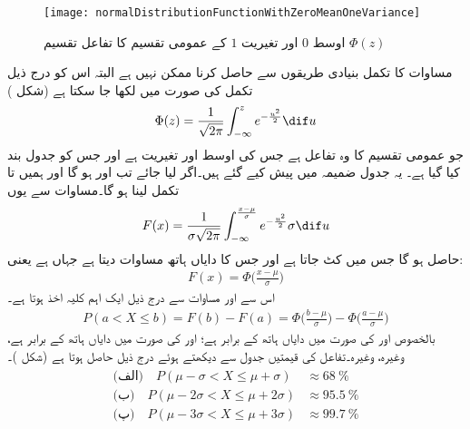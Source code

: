 \begin{figure}
\centering
\texttt{[image: normalDistributionFunctionWithZeroMeanOneVariance]}
\caption{اوسط $0$ اور تغیریت $1$ کے عمومی تقسیم کا  تفاعل تقسیم $\Phi(z)$}
\label{شکل_شماریات_عمومی_تقسیم_صفر_اوسط_اکائی_تغیریت}
\end{figure}
مساوات  کا تکمل بنیادی طریقوں سے حاصل کرنا ممکن نہیں ہے البتہ اس کو درج ذیل تکمل کی صورت میں لکھا جا سکتا ہے (شکل )
\begin{align}\label{مساوات_شماریات_عمومی_تقسیم_ت}
\Phi(z)=\frac{1}{\sqrt{2\pi}}\int_{-\infty}^{z}e^{-\frac{u^2}{2}}\dif u
\end{align}
جو عمومی تقسیم کا وہ تفاعل ہے جس کی اوسط  اور تغیریت  ہے اور جس کو جدول بند کیا گیا ہے۔ یہ جدول ضمیمہ  میں پیش کیے گئے ہیں۔اگر  لیا جائے تب  اور  ہو گا اور ہمیں  تا  تکمل لینا ہو گا۔مساوات  سے یوں
\begin{align*}
F(x)=\frac{1}{\sigma\sqrt{2\pi}}\int_{-\infty}^{\frac{x-\mu}{\sigma}}e^{-\frac{u^2}{2}}\sigma \dif u
\end{align*}
حاصل ہو گا جس میں  کٹ جاتا ہے اور جس کا دایاں ہاتھ مساوات  دیتا ہے جہاں   ہے یعنی:
\begin{align}\label{مساوات_شماریات_عمومی_تقسیم_ٹ}
F(x)=\Phi\big(\frac{x-\mu}{\sigma}\big)
\end{align}
اس سے اور مساوات  سے درج ذیل ایک اہم کلیہ  اخذ ہوتا ہے۔
\begin{align}\label{مساوات_شماریات_عمومی_تقسیم_ث}
P(a<X\le b)=F(b)-F(a)=\Phi\big(\frac{b-\mu}{\sigma}\big)-\Phi\big(\frac{a-\mu}{\sigma}\big)
\end{align}
بالخصوص  اور  کی صورت میں دایاں ہاتھ  کے برابر ہے؛  
 اور  کی صورت میں دایاں ہاتھ  کے برابر ہے، وغیرہ، وغیرہ۔تفاعل  کی قیمتیں جدول سے دیکھتے ہوئے درج ذیل حاصل ہوتا ہے (شکل )۔
\begin{gather}
\begin{aligned}\label{مساوات_شماریات_عمومی_تقسیم_ج}
\text{(الف)}\quad P(\mu-\sigma<X\le \mu+\sigma)&\approx \SI{68}{\percent}\\
\text{(ب)}\quad P(\mu-2\sigma<X\le \mu+2\sigma)&\approx \SI{95.5}{\percent}\\
\text{(پ)}\quad P(\mu-3\sigma<X\le \mu+3\sigma)&\approx \SI{99.7}{\percent}
\end{aligned}
\end{gather}

